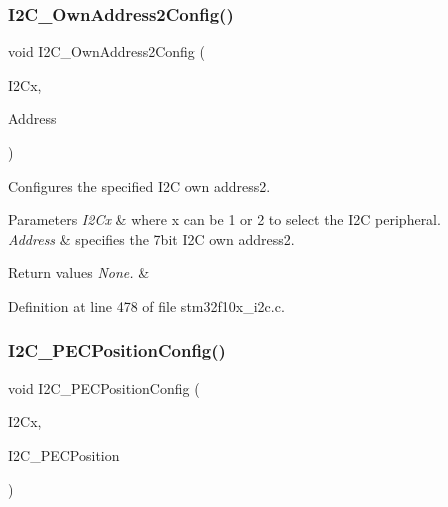 \subsubsection{\texorpdfstring{I2\+C\+\_\+\+Own\+Address2\+Config()}{I2C\_OwnAddress2Config()}}
{\footnotesize\ttfamily void I2\+C\+\_\+\+Own\+Address2\+Config (\begin{DoxyParamCaption}\item[{\hyperlink{struct_i2_c___type_def}{I2\+C\+\_\+\+Type\+Def} $\ast$}]{I2\+Cx,  }\item[{uint8\+\_\+t}]{Address }\end{DoxyParamCaption})}



Configures the specified I2C own address2. 


\begin{DoxyParams}{Parameters}
{\em I2\+Cx} & where x can be 1 or 2 to select the I2C peripheral. \\
\hline
{\em Address} & specifies the 7bit I2C own address2. \\
\hline
\end{DoxyParams}

\begin{DoxyRetVals}{Return values}
{\em None.} & \\
\hline
\end{DoxyRetVals}


Definition at line 478 of file stm32f10x\+\_\+i2c.\+c.

\mbox{\label{group___i2_c___exported___functions_ga5d0f939bdd45542502827bf408f24161}} 
\subsubsection{\texorpdfstring{I2\+C\+\_\+\+P\+E\+C\+Position\+Config()}{I2C\_PECPositionConfig()}}
{\footnotesize\ttfamily void I2\+C\+\_\+\+P\+E\+C\+Position\+Config (\begin{DoxyParamCaption}\item[{\hyperlink{struct_i2_c___type_def}{I2\+C\+\_\+\+Type\+Def} $\ast$}]{I2\+Cx,  }\item[{uint16\+\_\+t}]{I2\+C\+\_\+\+P\+E\+C\+Position }\end{DoxyParamCaption})}



